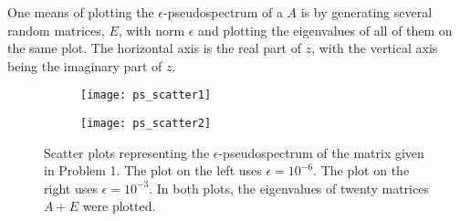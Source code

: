 One means of plotting the $\epsilon$-pseudospectrum of a $A$ is by generating several random matrices, $E$, with norm $\epsilon$ and plotting the eigenvalues of all of them on the same plot.  The horizontal axis is the real part of $z$, with the vertical axis being the imaginary part of $z$.

\begin{figure}
\begin{center}
\begin{subfigure}[b]{.49\textwidth}
\centering
\texttt{[image: ps\_scatter1]}
\end{subfigure}
\begin{subfigure}[b]{.49\textwidth}
\centering
\texttt{[image: ps\_scatter2]}
\end{subfigure}
\caption{Scatter plots representing the $\epsilon$-pseudospectrum of the matrix given in Problem 1. The plot on the left uses $\epsilon=10^{-6}$. The plot on the right uses $\epsilon=10^{-3}$. In both plots, the eigenvalues of twenty matrices $A+E$ were plotted.}
\label{fig:ps_scatter}
\end{center}
\end{figure}

